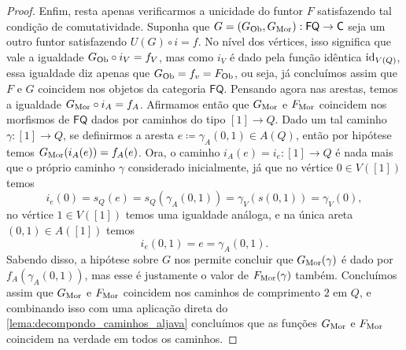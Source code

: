 \begin{proof}
    Enfim, resta apenas verificarmos a unicidade do funtor $F$ satisfazendo tal condição de comutatividade.
    Suponha que $G = (G_{\mathrm{Ob}},G_{\mathrm{Mor}}): \mathsf{FQ} \to \mathsf{C}$ seja um outro funtor satisfazendo $U(G) \circ i = f$.
    No nível dos vértices, isso significa que vale a igualdade $G_{\mathrm{Ob}} \circ i_V = f_V$, mas como $i_V$ é dado pela função idêntica $\mathrm{id}_{V(Q)}$, essa igualdade diz apenas que $G_{\mathrm{Ob}} = f_v = F_{\mathrm{Ob}}$, ou seja, já concluímos assim que $F$ e $G$ coincidem nos objetos da categoria $\mathsf{FQ}$.
    Pensando agora nas arestas, temos a igualdade $G_{\mathrm{Mor}} \circ i_A = f_A$.
    Afirmamos então que $G_{\mathrm{Mor}}$ e $F_{\mathrm{Mor}}$ coincidem nos morfismos de $\mathsf{FQ}$ dados por caminhos do tipo $[1] \to Q$.
    Dado um tal caminho $\gamma: [1] \to Q$, se definirmos a aresta $e \coloneqq \gamma_A(0,1) \in A(Q)$, então por hipótese temos $G_{\mathrm{Mor}}(i_A(e)) = f_A(e)$.
    Ora, o caminho $i_A(e) = i_e: [1] \to Q$ é nada mais que o próprio caminho $\gamma$ considerado inicialmente, já que no vértice $0 \in V([1])$ temos
    \begin{displaymath}
        i_e(0)
        = s_Q(e)
        = s_Q(\gamma_A(0,1))
        = \gamma_V(s(0,1))
        = \gamma_V(0),
    \end{displaymath}
    no vértice $1 \in V([1])$ temos uma igualdade análoga, e na única areta $(0,1) \in A([1])$ temos
    \begin{displaymath}
        i_e(0,1)
        = e
        = \gamma_A(0,1).
    \end{displaymath}
    Sabendo disso, a hipótese sobre $G$ nos permite concluir que $G_{\mathrm{Mor}}(\gamma)$ é dado por $f_A(\gamma_A(0,1))$, mas esse é justamente o valor de $F_{\mathrm{Mor}}(\gamma)$ também.
    Concluímos assim que $G_{\mathrm{Mor}}$ e $F_{\mathrm{Mor}}$ coincidem nos caminhos de comprimento $2$ em $Q$, e combinando isso com uma aplicação direta do \cref{lema:decompondo_caminhos_aljava} concluímos que as funções $G_{\mathrm{Mor}}$ e $F_{\mathrm{Mor}}$ coincidem na verdade em todos os caminhos.
\end{proof}

